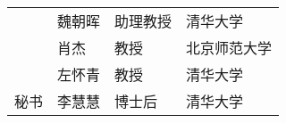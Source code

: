 \begin{committee}[name={学位论文公开评阅人和答辩委员会名单}]
\begin{center}
\begin{tabular}{C{2.75cm}C{2.98cm}C{4.63cm}C{4.63cm}@{}}
          & 魏朝晖                  & 助理教授                  & 清华大学       \\
          & 肖杰                  & 教授                    & 北京师范大学       \\
          & 左怀青                  & 教授                  & 清华大学       \\
      秘书 & 李慧慧                  & 博士后              & 清华大学       \\
    \end{tabular}
  \end{center}
\end{committee}



